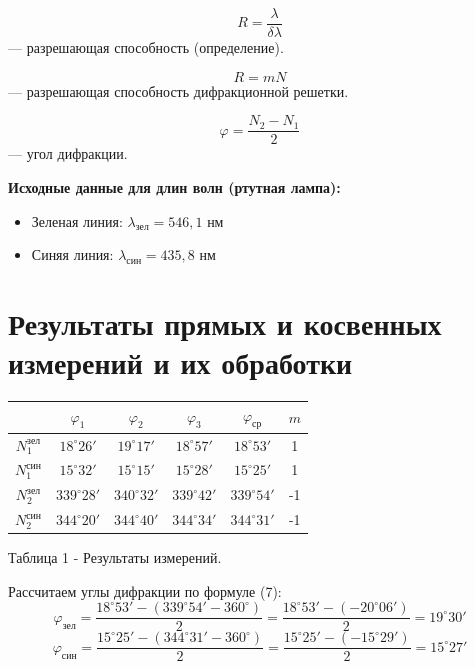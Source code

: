 \documentclass[a4paper,12pt]{article}
\begin{document}
\begin{equation}
R = \frac{\lambda}{\delta\lambda} \tag{5}
\end{equation}
— разрешающая способность (определение).

\begin{equation}
R = mN \tag{6}
\end{equation}
— разрешающая способность дифракционной решетки.

\begin{equation}
\varphi = \frac{N_2 - N_1}{2} \tag{7}
\end{equation}
— угол дифракции.

\vspace{0.5cm}
\textbf{Исходные данные для длин волн (ртутная лампа):}
\begin{itemize}
    \item Зеленая линия: $\lambda_{зел} = 546,1$ нм
    \item Синяя линия: $\lambda_{син} = 435,8$ нм
\end{itemize}

\section{Результаты прямых и косвенных измерений и их обработки}

\begin{center}
\begin{tabular}{|c|c|c|c|c|c|}
\hline
 & $\varphi_1$ & $\varphi_2$ & $\varphi_3$ & $\varphi_{ср}$ & $m$ \\ \hline
$N_1^{зел}$ & $18^\circ 26'$ & $19^\circ 17'$ & $18^\circ 57'$ & $18^\circ 53'$ & 1 \\ \hline
$N_1^{син}$ & $15^\circ 32'$ & $15^\circ 15'$ & $15^\circ 28'$ & $15^\circ 25'$ & 1 \\ \hline
$N_2^{зел}$ & $339^\circ 28'$ & $340^\circ 32'$ & $339^\circ 42'$ & $339^\circ 54'$ & -1 \\ \hline
$N_2^{син}$ & $344^\circ 20'$ & $344^\circ 40'$ & $344^\circ 34'$ & $344^\circ 31'$ & -1 \\ \hline
\end{tabular}

\medskip
Таблица 1 - Результаты измерений.
\end{center}

\noindent Рассчитаем углы дифракции по формуле (7):
\begin{equation*}
\varphi_{зел} = \frac{18^\circ 53' - (339^\circ 54' - 360^\circ)}{2} = \frac{18^\circ 53' - (-20^\circ 06')}{2} = 19^\circ 30'
\end{equation*}
\begin{equation*}
\varphi_{син} = \frac{15^\circ 25' - (344^\circ 31' - 360^\circ)}{2} = \frac{15^\circ 25' - (-15^\circ 29')}{2} = 15^\circ 27'
\end{equation*}
\end{document}
